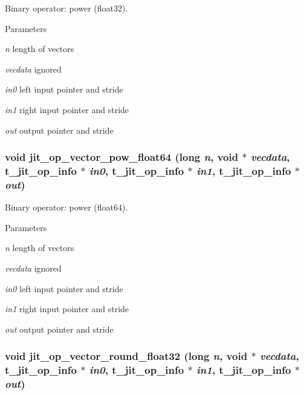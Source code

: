 Binary operator: power (float32). 
\begin{DoxyParams}{Parameters}
\item[{\em n}]length of vectors \item[{\em vecdata}]ignored \item[{\em in0}]left input pointer and stride \item[{\em in1}]right input pointer and stride \item[{\em out}]output pointer and stride \end{DoxyParams}
\hypertarget{group__opvecmod_ga1c047117c29b033974b73cc99e7b6de1}{
\subsubsection[{jit\_\-op\_\-vector\_\-pow\_\-float64}]{\setlength{\rightskip}{0pt plus 5cm}void jit\_\-op\_\-vector\_\-pow\_\-float64 (long {\em n}, \/  void $\ast$ {\em vecdata}, \/  {\bf t\_\-jit\_\-op\_\-info} $\ast$ {\em in0}, \/  {\bf t\_\-jit\_\-op\_\-info} $\ast$ {\em in1}, \/  {\bf t\_\-jit\_\-op\_\-info} $\ast$ {\em out})}}
\label{group__opvecmod_ga1c047117c29b033974b73cc99e7b6de1}


Binary operator: power (float64). 
\begin{DoxyParams}{Parameters}
\item[{\em n}]length of vectors \item[{\em vecdata}]ignored \item[{\em in0}]left input pointer and stride \item[{\em in1}]right input pointer and stride \item[{\em out}]output pointer and stride \end{DoxyParams}
\hypertarget{group__opvecmod_gaeb9f22a39d68084655686f4af6cace3c}{
\subsubsection[{jit\_\-op\_\-vector\_\-round\_\-float32}]{\setlength{\rightskip}{0pt plus 5cm}void jit\_\-op\_\-vector\_\-round\_\-float32 (long {\em n}, \/  void $\ast$ {\em vecdata}, \/  {\bf t\_\-jit\_\-op\_\-info} $\ast$ {\em in0}, \/  {\bf t\_\-jit\_\-op\_\-info} $\ast$ {\em in1}, \/  {\bf t\_\-jit\_\-op\_\-info} $\ast$ {\em out})}}
\label{group__opvecmod_gaeb9f22a39d68084655686f4af6cace3c}


